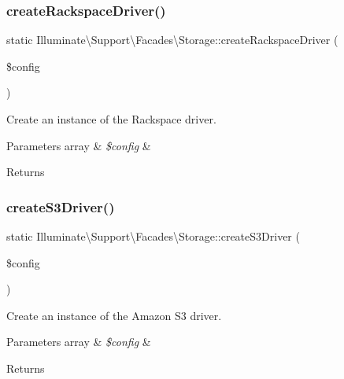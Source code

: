 \subsubsection{\texorpdfstring{create\+Rackspace\+Driver()}{createRackspaceDriver()}}
{\footnotesize\ttfamily static Illuminate\textbackslash{}\+Support\textbackslash{}\+Facades\textbackslash{}\+Storage\+::create\+Rackspace\+Driver (\begin{DoxyParamCaption}\item[{}]{\$config }\end{DoxyParamCaption})\hspace{0.3cm}{\ttfamily [static]}}

Create an instance of the Rackspace driver.


\begin{DoxyParams}[1]{Parameters}
array & {\em \$config} & \\
\hline
\end{DoxyParams}
\begin{DoxyReturn}{Returns}

\end{DoxyReturn}
\mbox{\label{class_illuminate_1_1_support_1_1_facades_1_1_storage_a1e32f6e2813cb377e6dee24d4d6cdb28}} 
\subsubsection{\texorpdfstring{create\+S3\+Driver()}{createS3Driver()}}
{\footnotesize\ttfamily static Illuminate\textbackslash{}\+Support\textbackslash{}\+Facades\textbackslash{}\+Storage\+::create\+S3\+Driver (\begin{DoxyParamCaption}\item[{}]{\$config }\end{DoxyParamCaption})\hspace{0.3cm}{\ttfamily [static]}}

Create an instance of the Amazon S3 driver.


\begin{DoxyParams}[1]{Parameters}
array & {\em \$config} & \\
\hline
\end{DoxyParams}
\begin{DoxyReturn}{Returns}

\end{DoxyReturn}
\mbox{\label{class_illuminate_1_1_support_1_1_facades_1_1_storage_afc991fa4fdaf1a6c91f6cbba6e043147}} 
